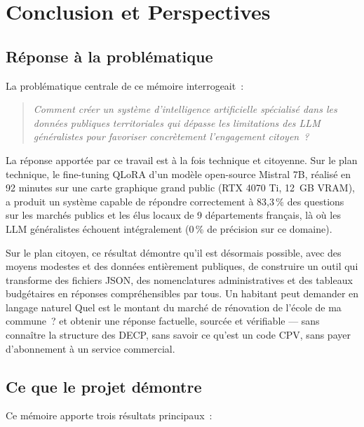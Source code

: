
\chapter{Conclusion et Perspectives}

\section{Réponse à la problématique}

La problématique centrale de ce mémoire interrogeait~:

\begin{quote}
\textit{Comment créer un système d'intelligence artificielle spécialisé dans les données publiques territoriales qui dépasse les limitations des LLM généralistes pour favoriser concrètement l'engagement citoyen~?}
\end{quote}

La réponse apportée par ce travail est à la fois technique et citoyenne. Sur le plan technique, le fine-tuning QLoRA d'un modèle open-source Mistral 7B, réalisé en 92 minutes sur une carte graphique grand public (RTX 4070 Ti, 12~GB VRAM), a produit un système capable de répondre correctement à 83,3\,\% des questions sur les marchés publics et les élus locaux de 9 départements français, là où les LLM généralistes échouent intégralement (0\,\% de précision sur ce domaine).

Sur le plan citoyen, ce résultat démontre qu'il est désormais possible, avec des moyens modestes et des données entièrement publiques, de construire un outil qui transforme des fichiers JSON, des nomenclatures administratives et des tableaux budgétaires en réponses compréhensibles par tous. Un habitant peut demander en langage naturel \og{}Quel est le montant du marché de rénovation de l'école de ma commune~?\fg{} et obtenir une réponse factuelle, sourcée et vérifiable --- sans connaître la structure des DECP, sans savoir ce qu'est un code CPV, sans payer d'abonnement à un service commercial.

\section{Ce que le projet démontre}

Ce mémoire apporte trois résultats principaux~:

